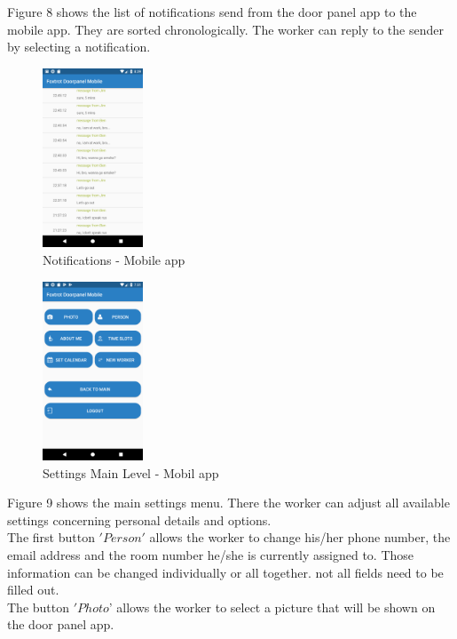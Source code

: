 \documentclass[article,colorback,accentcolor=tud4c, 11pt]{tudreport}
\begin{document}
Figure 8 shows the list of notifications send from the door panel app to the mobile app. They are sorted chronologically. The worker can reply to the sender by selecting a notification. \\
 
	\begin{figure}
		\centering
		\includegraphics[width=30mm,scale=0.8]{mobile/Notifications.png}
		\caption{Notifications - Mobile app}
	\end{figure}

	\begin{figure}
		\centering
		\includegraphics[width=30mm,scale=0.8]{mobile/Settings.png}
		\caption{Settings Main Level - Mobil app}
	\end{figure}	



Figure 9 shows the main settings menu. There the worker can adjust all available settings concerning personal details and options.\\

The first button $'Person'$ allows the worker to change his/her phone number, the email address and the room number he/she is currently assigned to. Those information can be changed individually or all together. not all fields need to be filled out.\\

The button $'Photo$' allows the worker to select a picture that will be shown on the door panel app.\\
 
\end{document}
